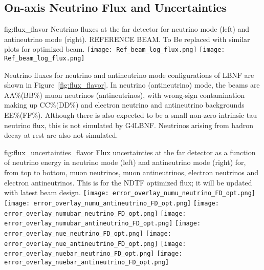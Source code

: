\subsection{On-axis Neutrino Flux and Uncertainties}

\begin{dunefigure}{fig:flux_flavor}
{Neutrino fluxes at the far detector for neutrino mode (left) and
antineutrino mode (right).  REFERENCE BEAM.  To Be replaced with similar plots for optimized beam. }
    \texttt{[image: Ref\_beam\_log\_flux.png]}
     \texttt{[image: Ref\_beam\_log\_flux.png]}
\end{dunefigure}


Neutrino fluxes for neutrino and antineutrino mode configurations of LBNF are shown in Figure~\ref{fig:flux_flavor}.  In neutrino (antineutrino) mode, the beams are AA\%(BB\%) muon neutrinos (antineutrinos), with wrong-sign contamination making up CC\%(DD\%) and electron neutrino and antineutrino backgrounds EE\%(FF\%).  Although there is also expected to be a small non-zero intrinsic tau neutrino flux, this is not simulated by G4LBNF.  Neutrinos arising from hadron decay at rest are also not simulated.  

\begin{dunefigure}{fig:flux_uncertainties_flavor}
{Flux uncertainties at the far detector as a function of neutrino energy in neutrino mode (left) and antineutrino mode (right) for, from top to bottom, muon neutrinos, muon antineutrinos, electron neutrinos and electron antineutrinos.   This is for the NDTF optimized flux; it will  be updated with latest beam design.   }
    \texttt{[image: error\_overlay\_numu\_neutrino\_FD\_opt.png]}
    \texttt{[image: error\_overlay\_numu\_antineutrino\_FD\_opt.png]}
    \texttt{[image: error\_overlay\_numubar\_neutrino\_FD\_opt.png]}
    \texttt{[image: error\_overlay\_numubar\_antineutrino\_FD\_opt.png]}
        \texttt{[image: error\_overlay\_nue\_neutrino\_FD\_opt.png]}
    \texttt{[image: error\_overlay\_nue\_antineutrino\_FD\_opt.png]}
        \texttt{[image: error\_overlay\_nuebar\_neutrino\_FD\_opt.png]}
    \texttt{[image: error\_overlay\_nuebar\_antineutrino\_FD\_opt.png]}
    \end{dunefigure}




